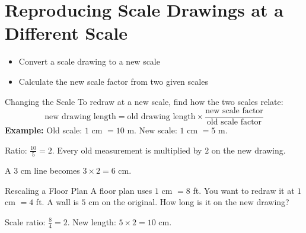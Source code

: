 \section{Reproducing Scale Drawings at a Different Scale}

\begin{learningGoals}
\begin{itemize}
    \item Convert a scale drawing to a new scale
    \item Calculate the new scale factor from two given scales
\end{itemize}
\end{learningGoals}

\begin{conceptBox}{Changing the Scale}
To redraw at a new scale, find how the two scales relate:
$$\text{new drawing length} = \text{old drawing length} \times \frac{\text{new scale factor}}{\text{old scale factor}}$$
\textbf{Example:} Old scale: $1$ cm $= 10$ m. New scale: $1$ cm $= 5$ m.

Ratio: $\frac{10}{5} = 2$. Every old measurement is multiplied by $2$ on the new drawing.

A $3$ cm line becomes $3 \times 2 = 6$ cm.
\end{conceptBox}

\begin{workedExample}{Rescaling a Floor Plan}
A floor plan uses $1$ cm $= 8$ ft. You want to redraw it at $1$ cm $= 4$ ft. A wall is $5$ cm on the original. How long is it on the new drawing?

Scale ratio: $\frac{8}{4} = 2$. New length: $5 \times 2 = 10$ cm.
\end{workedExample}



